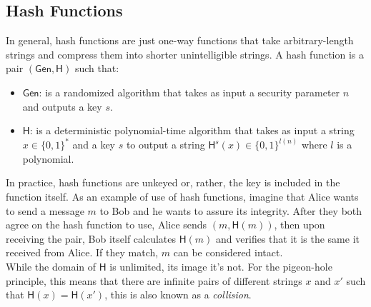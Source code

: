 \begin{nopbreak}
    \subsection{Hash Functions}\label{sec:hash}
    In general, hash functions are just one-way functions that take arbitrary-length strings and compress them into shorter unintelligible strings.
    A hash function is a pair $(\mathsf{Gen}, \mathsf{H})$ such that:
    \begin{itemize}
        \item{$\mathsf{Gen}$: is a randomized algorithm that takes as input a security parameter $n$ and outputs a key $s$.}
        \item{$\mathsf{H}$: is a deterministic polynomial-time algorithm that takes as input a string $x \in \{0,1\}^*$ and a key $s$ to output a string $\mathsf{H}^s(x) \in \{0,1\}^{\mathit{l}(n)}$ where $\mathit{l}$ is a polynomial.}
    \end{itemize}
\end{nopbreak}
In practice, hash functions are unkeyed or, rather, the key is included in the function itself.
    As an example of use of hash functions, imagine that Alice wants to send a message $m$ to Bob and he wants to assure its integrity. After they both agree on the hash function to use, Alice sends $(m, \mathsf{H}(m))$, then upon receiving the pair, Bob itself calculates $\mathsf{H}(m)$ and verifies that it is the same it received from Alice. If they match, $m$ can be considered intact.\\
While the domain of $\mathsf{H}$ is unlimited, its image it's not. For the pigeon-hole principle, this means that there are infinite pairs of different strings $x$ and $x'$ such that $\mathsf{H}(x) = \mathsf{H}(x')$, this is also known as a \emph{collision}.

